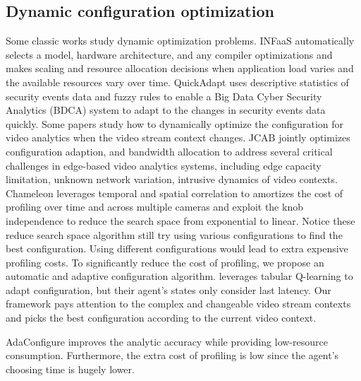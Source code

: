 \subsection{Dynamic configuration optimization}
Some classic works study dynamic optimization problems. INFaaS \cite{romero2019infaas} automatically selects a model, hardware architecture, and any compiler optimizations and makes scaling and resource allocation decisions when application load varies and the available resources vary over time. QuickAdapt \cite{ullah2019quickadapt} uses descriptive statistics of security events data and fuzzy rules to enable a Big Data Cyber Security Analytics (BDCA) system to adapt to the changes in security events data quickly. Some papers study how to dynamically optimize the configuration for video analytics when the video stream context changes. JCAB \cite{wang2020jcab} jointly optimizes configuration adaption, and bandwidth allocation to address several critical challenges in edge-based video analytics systems, including edge capacity limitation, unknown network variation, intrusive dynamics of video contexts. Chameleon \cite{jiang2018chameleon} leverages temporal and spatial correlation to amortizes the cost of profiling over time and across multiple cameras and exploit the knob independence to reduce the search space from exponential to linear. Notice these reduce search space algorithm still try using various configurations to find the best configuration. Using different configurations would lead to extra expensive profiling costs. To significantly reduce the cost of profiling, we propose an automatic and adaptive configuration algorithm. \cite{argerich2019orchestration} leverages tabular Q-learning to adapt configuration, but their agent's states only consider last latency. Our framework pays attention to the complex and changeable video stream contexts and picks the best configuration according to the current video context. 


AdaConfigure improves the analytic accuracy while providing low-resource consumption. Furthermore, the extra cost of profiling is low since the agent's choosing time is hugely lower.

